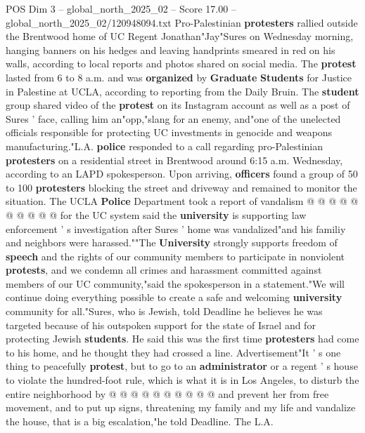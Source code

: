 \begin{textsample}{POS Dim 3 – global\_north\_2025\_02 – Score 17.00 – global\_north\_2025\_02/120948094.txt}  \label{ex:f3_pos_284}
Pro-Palestinian \textbf{protesters} rallied outside the Brentwood home of UC Regent Jonathan"Jay"Sures on Wednesday morning, hanging banners on his hedges and leaving handprints smeared in red on his walls, according to local reports and photos shared on social media.
The \textbf{protest} lasted from 6 to 8 a.m. and was \textbf{organized} by \textbf{Graduate} \textbf{Students} for Justice in Palestine at UCLA, according to reporting from the Daily Bruin.
The \textbf{student} group shared video of the \textbf{protest} on its Instagram account as well as a post of Sures ' face, calling him an"opp,"slang for an enemy, and"one of the unelected officials responsible for protecting UC investments in genocide and weapons manufacturing."L.A. \textbf{police} responded to a call regarding pro-Palestinian \textbf{protesters} on a residential street in Brentwood around 6:15 a.m.
Wednesday, according to an LAPD spokesperson.
Upon arriving, \textbf{officers} found a group of 50 to 100 \textbf{protesters} blocking the street and driveway and remained to monitor the situation.
The UCLA \textbf{Police} Department took a report of vandalism @ @ @ @ @ @ @ @ @ @ for the UC system said the \textbf{university} is supporting law enforcement ' s investigation after Sures ' home was vandalized"and his familiy and neighbors were harassed.""The \textbf{University} strongly supports freedom of \textbf{speech} and the rights of our community members to participate in nonviolent \textbf{protests}, and we condemn all crimes and harassment committed against members of our UC community,"said the spokesperson in a statement."We will continue doing everything possible to create a safe and welcoming \textbf{university} community for all."Sures, who is Jewish, told Deadline he believes he was targeted because of his outspoken support for the state of Israel and for protecting Jewish \textbf{students}.
He said this was the first time \textbf{protesters} had come to his home, and he thought they had crossed a line.
Advertisement"It ' s one thing to peacefully \textbf{protest}, but to go to an \textbf{administrator} or a regent ' s house to violate the hundred-foot rule, which is what it is in Los Angeles, to disturb the entire neighborhood by @ @ @ @ @ @ @ @ @ @ and prevent her from free movement, and to put up signs, threatening my family and my life and vandalize the house, that is a big escalation,"he told Deadline.
The L.A.

\end{textsample}
